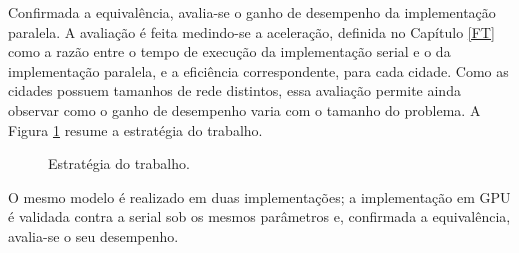Confirmada a equivalência, avalia-se o ganho de desempenho da implementação paralela. A avaliação é feita medindo-se a aceleração, definida no Capítulo \ref{FT} como a razão entre o tempo de execução da implementação serial e o da implementação paralela, e a eficiência correspondente, para cada cidade. Como as cidades possuem tamanhos de rede distintos, essa avaliação permite ainda observar como o ganho de desempenho varia com o tamanho do problema. A Figura \ref{fig:estrategia} resume a estratégia do trabalho.

\begin{figure}[H]
\centering
\caption{Estratégia do trabalho.}
\label{fig:estrategia}
\end{figure}

O mesmo modelo é realizado em duas implementações; a implementação em GPU é validada contra a serial sob os mesmos parâmetros e, confirmada a equivalência, avalia-se o seu desempenho.
